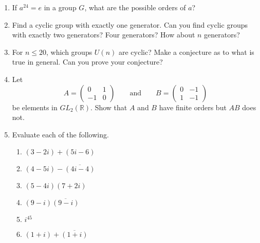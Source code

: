 {\begin{enumerate}
\begin{multicols}{3}
\begin{enumerate}
 \item
${\mathbb Z}$
 
 \item
${\mathbb Q}^\ast$
 
 \item
${\mathbb R}^\ast$
 
\end{enumerate}
 \end{multicols}
 
\item
If $a^{24} =e$ in a group $G$, what are the possible orders of $a$? 
 
 
\item
Find a cyclic group with exactly one generator.  Can you find cyclic
groups with exactly two generators?  Four generators?  How about $n$
generators?
 
 
\item
For $n \leq 20$, which groups $U(n)$ are cyclic?  Make a conjecture as
to what is true in general.  Can you prove your conjecture?  
 
 
\item
Let
\[
A=
\begin{pmatrix}
0 & 1 \\
-1 & 0
\end{pmatrix}
\qquad \text{and} \qquad
B=
\begin{pmatrix}
0 & -1 \\
1 & -1
\end{pmatrix}
\]
be elements in $GL_2( {\mathbb R} )$. Show that $A$ and $B$ have finite
orders but $AB$ does not. 
 
 
\item
Evaluate each of the following.
\begin{multicols}{2}
\begin{enumerate}
 
\item
$(3-2i)+ (5i-6)$

 
\item
 $(4-5i)-\overline{(4i -4)}$
 
 \item
$(5-4i)(7+2i)$
 
\item
$(9-i) \overline{(9-i)}$
 
 \item
$i^{45}$

\item
$(1+i)+\overline{(1+i)}$
 
\end{enumerate}
\end{multicols}
 

\end{enumerate}}
